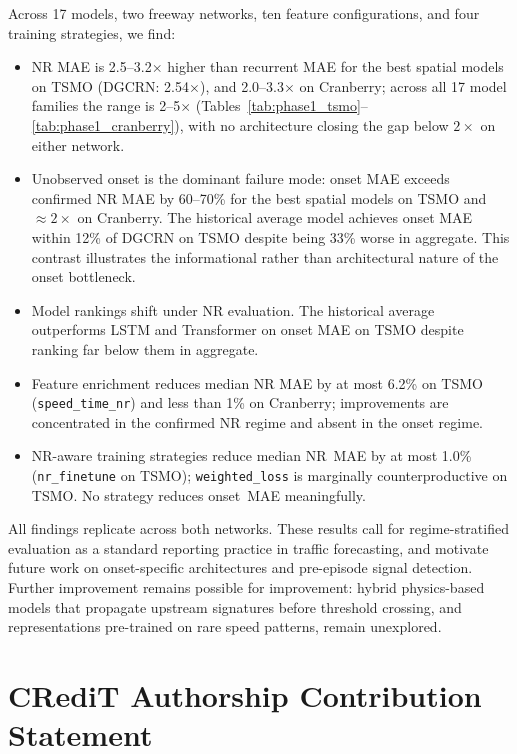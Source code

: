 \documentclass[a4paper]{cas-sc}
\begin{document}
Across 17 models, two freeway networks, ten feature configurations,
and four training strategies, we find:
\begin{itemize}
  \item NR MAE is 2.5--3.2$\times$ higher than recurrent MAE for the
        best spatial models on TSMO (DGCRN: 2.54$\times$), and
        2.0--3.3$\times$ on Cranberry; across all 17 model families the
        range is 2--5$\times$ (Tables~\ref{tab:phase1_tsmo}--\ref{tab:phase1_cranberry}),
        with no architecture closing the gap below $2\times$ on either network.
  \item Unobserved onset is the dominant failure mode: onset MAE
        exceeds confirmed NR MAE by 60--70\% for the best spatial
        models on TSMO and $\approx 2\times$ on Cranberry.
        The historical average model achieves onset MAE within 12\%
        of DGCRN on TSMO despite being 33\% worse in aggregate.
        This contrast illustrates the informational rather than
        architectural nature of the onset bottleneck.
  \item Model rankings shift under NR evaluation.
        The historical average outperforms LSTM and Transformer
        on onset MAE on TSMO despite ranking far below them in
        aggregate.
  \item Feature enrichment reduces median NR MAE by at most 6.2\%
        on TSMO (\texttt{speed\_time\_nr}) and less than 1\% on
        Cranberry; improvements are concentrated in the confirmed NR
        regime and absent in the onset regime.
  \item NR-aware training strategies reduce median NR~MAE by at most
        1.0\% (\texttt{nr\_finetune} on TSMO); \texttt{weighted\_loss}
        is marginally counterproductive on TSMO.
        No strategy reduces onset~MAE meaningfully.
\end{itemize}

All findings replicate across both networks.
These results call for regime-stratified evaluation as a standard
reporting practice in traffic forecasting, and motivate
future work on onset-specific architectures and pre-episode signal
detection.
Further improvement remains possible
for improvement: hybrid physics-based models that propagate upstream
signatures before threshold crossing, and representations pre-trained
on rare speed patterns, remain unexplored.

\section*{CRediT Authorship Contribution Statement}
\end{document}
